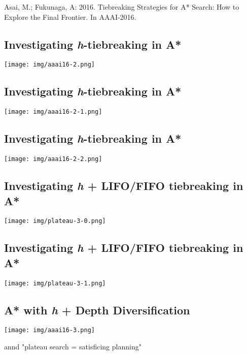\begin{note}
Asai, M.; Fukunaga, A: 2016. Tiebreaking Strategies for A* Search: How to Explore the Final Frontier. In AAAI-2016.
\end{note}

\subsection{Investigating \emph{h}-tiebreaking in A*}
\label{sec-5-2}

\texttt{[image: img/aaai16-2.png]}

\subsection{Investigating \emph{h}-tiebreaking in A*}
\label{sec-5-3}

\texttt{[image: img/aaai16-2-1.png]}

\subsection{Investigating \emph{h}-tiebreaking in A*}
\label{sec-5-4}

\texttt{[image: img/aaai16-2-2.png]}

\subsection{Investigating \emph{h} + LIFO/FIFO tiebreaking in A*}
\label{sec-5-5}

\texttt{[image: img/plateau-3-0.png]}

\subsection{Investigating \emph{h} + LIFO/FIFO tiebreaking in A*}
\label{sec-5-6}

\texttt{[image: img/plateau-3-1.png]}

\subsection{A* with \emph{h} + Depth Diversification}
\label{sec-5-7}

\texttt{[image: img/aaai16-3.png]}

annd "plateau search = satisficing planning"

\section{}
\label{sec-6}

